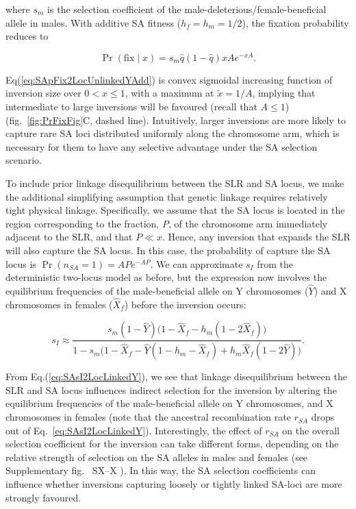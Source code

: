 \documentclass{article}[12pt]
\newcommand\hl[1]{%
  \bgroup
  \hskip0pt\color{blue!80!black}%
  #1%
  \egroup
}
\begin{document}
\noindent where $s_m$ is the selection coefficient of the male-deleterious/female-beneficial allele in males. With additive SA fitness ($h_f = h_m = 1/2$), the fixation probability reduces to
\begin{linenomath*}
\begin{equation}\label{eq:SApFix2LocUnlinkedYAdd}
	\Pr(\text{fix} \mid x) = s_m \hat{q} (1 - \hat{q}) xA e^{-xA}.
\end{equation}
\end{linenomath*}

\noindent Eq(\ref{eq:SApFix2LocUnlinkedYAdd}) is convex sigmoidal increasing function of inversion size over $0 < x \leq 1$, with a maximum at $\tilde{x} = 1/A $, implying that intermediate to large inversions will be favoured (recall that $A \leq 1 $) (fig.~\ref{fig:PrFixFig}C, dashed line). Intuitively, larger inversions are more likely to capture rare SA loci distributed uniformly along the chromosome arm, which is necessary for them to have any selective advantage under the SA selection scenario.

To include prior linkage disequilibrium between the SLR and SA locus, we make the additional simplifying assumption that genetic linkage requires relatively tight physical linkage. Specifically, we assume that the SA locus is located in the region corresponding to the fraction, $P$, of the chromosome arm immediately adjacent to the SLR, and that $P \ll x$. Hence, any inversion that expands the SLR will also capture the SA locus. In this case, the probability of capture the SA locus is $\Pr(n_{SA} = 1) = AP e^{-AP}$. We can approximate $s_I$ from the deterministic two-locus model as before, but the expression now involves the equilibrium frequencies of the male-beneficial allele on Y chromosomes ($\hat{Y}$) and X chromosomes in females ($\hat{X}_f$) before the inversion occurs:
\begin{linenomath*}
\begin{equation}\label{eq:SAsI2LocLinkedY}
	s_I \approx \frac{ s_m(1 - \hat{Y}) \big( 1 - \hat{X}_f - h_m(1 - 2\hat{X}_f) \big)} { 1 - s_m \big(1 - \hat{X}_f - \hat{Y}(1 - h_m - \hat{X}_f) + h_m \hat{X}_f(1 - 2 \hat{Y}) \big) }.
\end{equation}
\end{linenomath*}

\noindent From Eq.(\ref{eq:SAsI2LocLinkedY}), we see that linkage disequilibrium between the SLR and SA locus influences indirect selection for the inversion by altering the equilibrium frequencies of the male-beneficial allele on Y chromosomes, and X chromosomes in females (note that the ancestral recombination rate $r_{SA}$ drops out of Eq.~\ref{eq:SAsI2LocLinkedY}). Interestingly, the effect of $r_{SA}$ on the overall selection coefficient for the inversion can take different forms, depending on the relative strength of selection on the SA alleles in males and females (see Supplementary fig.~\hl{SX--X}). In this way, the SA selection coefficients can influence whether inversions capturing loosely or tightly linked SA-loci are more strongly favoured. 
\end{document}
